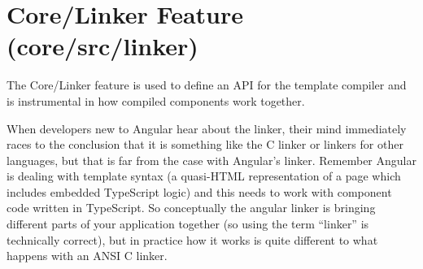 \section{Core/Linker Feature (core/src/linker)}

The Core/Linker feature is used to define an API for the template compiler and is
instrumental in how compiled components work together.

When developers new to Angular hear about the linker, their mind immediately races
to the conclusion that it is something like the C linker or linkers for other languages,
but that is far from the case with Angular’s linker. Remember Angular is dealing with
template syntax (a quasi-HTML representation of a page which includes embedded
TypeScript logic) and this needs to work with component code written in TypeScript.
So conceptually the angular linker is bringing different parts of your application
together (so using the term “linker” is technically correct), but in practice how it works
is quite different to what happens with an ANSI C linker.









